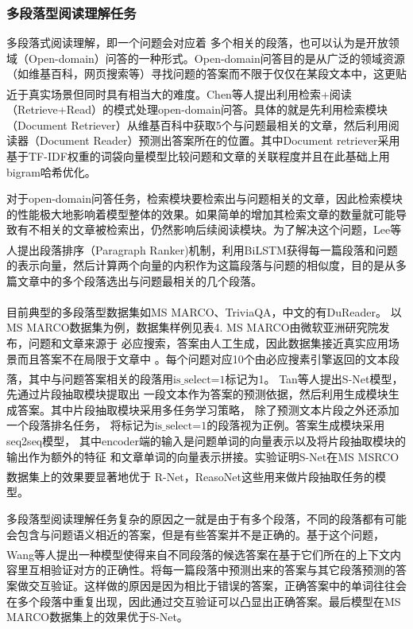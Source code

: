 \documentclass{article}
\newcommand{\upcite}[1]{\textsuperscript{\textsuperscript{\cite{#1}}}}
\begin{document}
\subsubsection{多段落型阅读理解任务}
多段落式阅读理解，即一个问题会对应着
多个相关的段落，也可以认为是开放领域（Open-domain）问答的一种形式。Open-domain问答目的是从广泛的领域资源（如维基百科，网页搜索等）寻找问题的答案而不限于仅仅在某段文本中，这更贴近于真实场景但同时具有相当大的难度。Chen等人\upcite{DrQA}提出利用检索+阅读（Retrieve+Read）的模式处理open-domain问答。具体的就是先利用检索模块（Document Retriever）从维基百科中获取5个与问题最相关的文章，然后利用阅读器（Document Reader）预测出答案所在的位置。其中Document retriever采用基于TF-IDF权重的词袋向量模型比较问题和文章的关联程度并且在此基础上用bigram哈希优化。

对于open-domain问答任务，检索模块要检索出与问题相关的文章，因此检索模块的性能极大地影响着模型整体的效果。如果简单的增加其检索文章的数量就可能导致有不相关的文章被检索出，仍然影响后续阅读模块。为了解决这个问题，Lee等人\upcite{Ranking}提出段落排序（Paragraph Ranker)机制，利用BiLSTM获得每一篇段落和问题的表示向量，然后计算两个向量的内积作为这篇段落与问题的相似度，目的是从多篇文章中的多个段落选出与问题最相关的几个段落。


目前典型的多段落型数据集如MS MARCO\upcite{MSmarco}、TriviaQA\upcite{TriviaQA}，中文的有DuReader\upcite{DuReader}。
以MS MARCO数据集为例，数据集样例见表4. MS MARCO由微软亚洲研究院发布，问题和文章来源于
必应搜索，答案由人工生成，因此数据集接近真实应用场景而且答案不在局限于文章中
。每个问题对应10个由必应搜素引擎返回的文本段落，其中与问题答案相关的段落用$\text{is\_select=1}$标记为1。
Tan等人\upcite{SNet}提出S-Net模型，
先通过片段抽取模块提取出
一段文本作为答案的预测依据，然后利用生成模块生成答案。其中片段抽取模块采用多任务学习策略，
除了预测文本片段之外还添加一个段落排名任务，
将标记为$\text{is\_select=1}$的段落视为正例。答案生成模块采用seq2seq模型，
其中encoder端的输入是问题单词的向量表示以及将片段抽取模块的输出作为额外的特征
和文章单词的向量表示拼接。实验证明S-Net在MS MSRCO数据集上的效果要显著地优于
R-Net\upcite{RNet}，ReasoNet\upcite{Reasonet}这些用来做片段抽取任务的模型。

多段落型阅读理解任务复杂的原因之一就是由于有多个段落，不同的段落都有可能会包含与问题语义相近的答案，但是有些答案并不是正确的。基于这个问题，Wang等人\upcite{VNet}提出一种模型使得来自不同段落的候选答案在基于它们所在的上下文内容里互相验证对方的正确性。将每一篇段落中预测出来的答案与其它段落预测的答案做交互验证。这样做的原因是因为相比于错误的答案，正确答案中的单词往往会在多个段落中重复出现，因此通过交互验证可以凸显出正确答案。最后模型在MS MARCO数据集上的效果优于S-Net。
\end{document}
